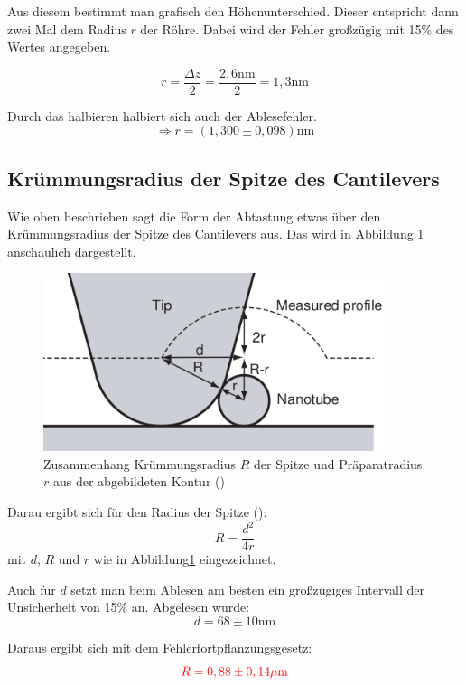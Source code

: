 Aus diesem bestimmt man grafisch den Höhenunterschied. Dieser entspricht dann zwei Mal dem Radius $r$ der Röhre. Dabei wird der Fehler 
großzügig mit 15\% des Wertes angegeben.

\begin{equation*}
   r = \frac{\Delta z}{2} = \frac{2,6\mathrm{nm}}{2} = 1,3\mathrm{nm}
\end{equation*}

Durch das halbieren halbiert sich auch der Ablesefehler. 
\begin{equation*}
    \Rightarrow r = (1,300 \pm 0,098)\mathrm{nm}
\end{equation*}


\subsection{Krümmungsradius der Spitze des Cantilevers}

Wie oben beschrieben sagt die Form der Abtastung etwas über den Krümmungsradius der Spitze des Cantilevers aus. Das wird in Abbildung 
\ref{NanoTip} anschaulich dargestellt.

\begin{figure}
    \centering
    \includegraphics[width = 10cm]{Bilder/Nanotubes/TipGeoNano.png}
    \caption{Zusammenhang Krümmungsradius $R$ der Spitze und Präparatradius $r$ aus der abgebildeten Kontur (\cite[S.46]{SampleKit2007})}
    \label{NanoTip}
\end{figure}

Darau ergibt sich für den Radius der Spitze (\cite[S.47]{SampleKit2007}):\\
\begin{equation}
    R = \frac{d^2}{4r}
\end{equation}
mit $d$, $R$ und $r$ wie in Abbildung\ref{NanoTip} eingezeichnet.

Auch für $d$ setzt man beim Ablesen am besten ein großzügiges Intervall der Unsicherheit von 15\% an. Abgelesen wurde:\\

\begin{equation*}
    d = 68\pm10\mathrm{nm}
\end{equation*}

Daraus ergibt sich mit dem Fehlerfortpflanzungsgesetz:\\

\begin{equation}
    \textcolor{red}{R = 0,88\pm0,14 \mu \mathrm{m}}
\end{equation}